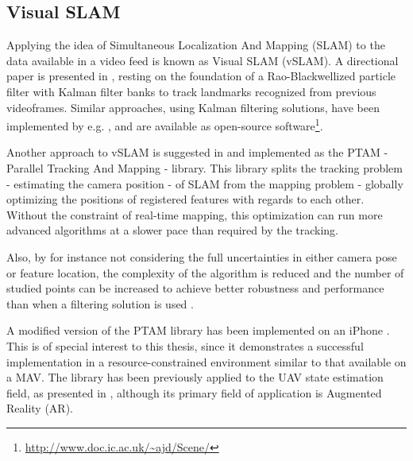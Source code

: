     \subsection{Visual SLAM}
    Applying the idea of Simultaneous Localization And Mapping (SLAM)
    to the data available in a video feed is known as Visual SLAM (vSLAM).
    A directional paper is presented in \citep{Karlsson05thevslam}, resting on the
    foundation of a Rao-Blackwellized particle filter with Kalman filter banks
    to track landmarks recognized from previous videoframes.
    Similar approaches, using Kalman filtering solutions, have been implemented by e.g. \citep{DBLP:conf/iccv/Davison03,Eade:2006:SMS:1153170.1153506},
    and are available as open-source software\footnote{\url{http://www.doc.ic.ac.uk/~ajd/Scene/}}.

    Another approach to vSLAM is suggested in \citep{klein07parallel} and
    implemented as the PTAM - Parallel Tracking And Mapping - library.
    This library splits the tracking problem - estimating the camera position -
    of SLAM from the mapping problem - globally optimizing the positions of
    registered features with regards to each other.
    Without the constraint of real-time mapping, this optimization can run
    more advanced algorithms at a slower pace than required by the tracking.

    Also, by for instance not considering the full uncertainties in either camera pose or feature location,
    the complexity of the algorithm is reduced and the number of studied points
    can be increased to achieve better robustness and
    performance than when a filtering solution is used \citep{DBLP:conf/icra/StrasdatMD10}.

    A modified version of the PTAM library has been implemented on an iPhone \citep{klein09cameraphone}.
    This is of special interest to this thesis, since it demonstrates
    a successful implementation in a resource-constrained environment similar to that available on a MAV.
    The library has been previously applied to the UAV state estimation field, as presented in \citep{weiss11monocular},
    although its primary field of application is Augmented Reality (AR).


